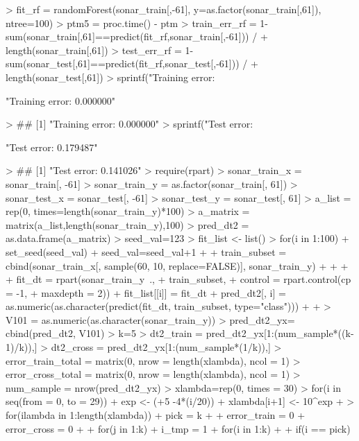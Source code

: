 \documentclass{article}
\begin{document}
\begin{Schunk}
\begin{Sinput}
> fit_rf = randomForest(sonar_train[,-61], y=as.factor(sonar_train[,61]), ntree=100)
> ptm5 = proc.time() - ptm
> train_err_rf = 1-sum(sonar_train[,61]==predict(fit_rf,sonar_train[,-61])) / 
+                 length(sonar_train[,61])
> test_err_rf = 1-sum(sonar_test[,61]==predict(fit_rf,sonar_test[,-61])) / 
+                 length(sonar_test[,61])
> sprintf("Training error: %f", train_err_rf)
\end{Sinput}
\begin{Soutput}
[1] "Training error: 0.000000"
\end{Soutput}
\begin{Sinput}
> ## [1] "Training error: 0.000000"
> sprintf("Test error: %f", test_err_rf)
\end{Sinput}
\begin{Soutput}
[1] "Test error: 0.179487"
\end{Soutput}
\begin{Sinput}
> ## [1] "Test error: 0.141026"
> require(rpart)
> sonar_train_x = sonar_train[, -61]
> sonar_train_y = as.factor(sonar_train[, 61])
> sonar_test_x = sonar_test[, -61]
> sonar_test_y = sonar_test[, 61]
> a_list = rep(0, times=length(sonar_train_y)*100)
> a_matrix = matrix(a_list,length(sonar_train_y),100)
> pred_dt2 = as.data.frame(a_matrix)
> seed_val=123
> fit_list <- list()
> for(i in 1:100){
+   set_seed(seed_val)
+   seed_val=seed_val+1
+   
+   train_subset = cbind(sonar_train_x[, sample(60, 10, replace=FALSE)], sonar_train_y)
+   
+   
+   
+   fit_dt = rpart(sonar_train_y~., 
+                  train_subset, 
+                  control = rpart.control(cp = -1, 
+                                          maxdepth = 2))
+   fit_list[[i]] = fit_dt
+   pred_dt2[, i] = as.numeric(as.character(predict(fit_dt, train_subset, type="class")))
+   
+ }
> V101 = as.numeric(as.character(sonar_train_y))
> pred_dt2_yx= cbind(pred_dt2, V101)
> k=5
> dt2_train = pred_dt2_yx[1:(num_sample*((k-1)/k)),]
> dt2_cross = pred_dt2_yx[1:(num_sample*(1/k)),]
> error_train_total = matrix(0, nrow = length(xlambda), ncol = 1)
> error_cross_total = matrix(0, nrow = length(xlambda), ncol = 1)
> num_sample = nrow(pred_dt2_yx)
> xlambda=rep(0, times = 30)
> for(i in seq(from = 0, to = 29)){
+   exp <- (+5 -4*(i/20))
+   xlambda[i+1] <- 10^exp
+ }
> for(ilambda in 1:length(xlambda)){
+   pick = k 
+   
+   error_train = 0
+   error_cross = 0
+   
+   for(j in 1:k){
+     i_tmp = 1
+     for(i in 1:k){
+       
+       if(i == pick){
}}}}
\end{Sinput}
\end{Schunk}
\end{document}
